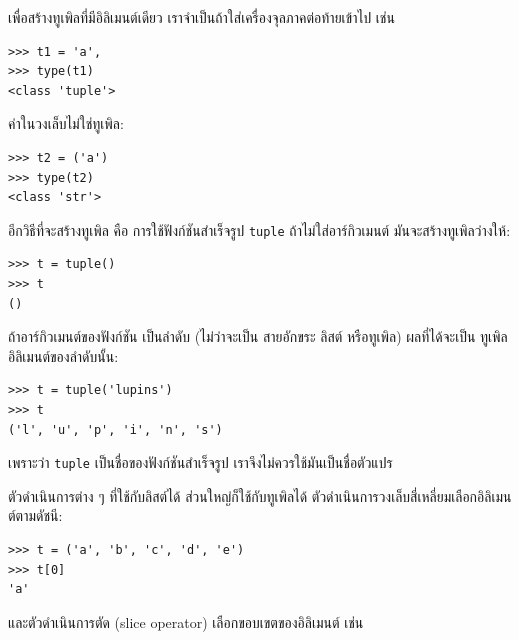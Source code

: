เพื่อสร้างทูเพิลที่มีอิลิเมนต์เดียว เราจำเป็นถ้าใส่เครื่องจุลภาคต่อท้ายเข้าไป
เช่น

\begin{verbatim}
>>> t1 = 'a',
>>> type(t1)
<class 'tuple'>
\end{verbatim}
%
ค่าในวงเล็บไม่ใช่ทูเพิล:

\begin{verbatim}
>>> t2 = ('a')
>>> type(t2)
<class 'str'>
\end{verbatim}
%

อีกวิธีที่จะสร้างทูเพิล คือ การใช้ฟังก์ชันสำเร็จรูป \texttt{tuple}
ถ้าไม่ใส่อาร์กิวเมนต์  มันจะสร้างทูเพิลว่างให้:

\begin{verbatim}
>>> t = tuple()
>>> t
()
\end{verbatim}
%

ถ้าอาร์กิวเมนต์ของฟังก์ชัน เป็นลำดับ (ไม่ว่าจะเป็น สายอักขระ ลิสต์ หรือทูเพิล)
ผลที่ได้จะเป็น ทูเพิลอิลิเมนต์ของลำดับนั้น:

\begin{verbatim}
>>> t = tuple('lupins')
>>> t
('l', 'u', 'p', 'i', 'n', 's')
\end{verbatim}
%

เพราะว่า \texttt{tuple} เป็นชื่อของฟังก์ชันสำเร็จรูป
เราจึงไม่ควรใช้มันเป็นชื่อตัวแปร


ตัวดำเนินการต่าง ๆ ที่ใช้กับลิสต์ได้ ส่วนใหญ่ก็ใช้กับทูเพิลได้
ตัวดำเนินการวงเล็บสี่เหลี่ยมเลือกอิลิเมนต์ตามดัชนี:

\begin{verbatim}
>>> t = ('a', 'b', 'c', 'd', 'e')
>>> t[0]
'a'
\end{verbatim}
%
%
และตัวดำเนินการตัด (slice operator) เลือกขอบเขตของอิลิเมนต์ เช่น


